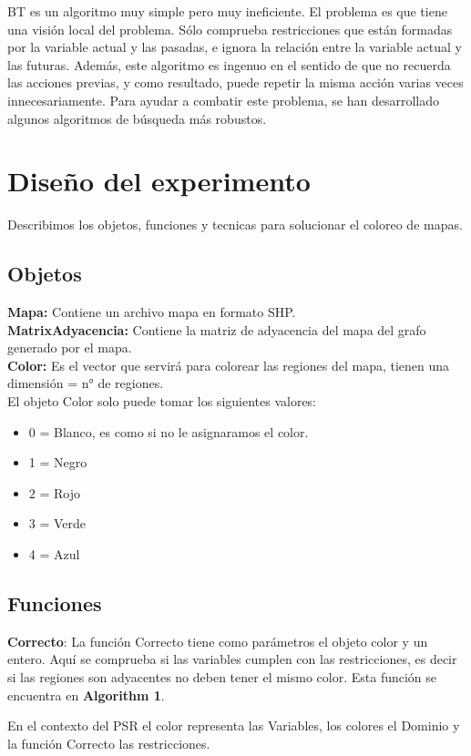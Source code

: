 \documentclass[a4paper]{article}
\begin{document}
BT es un algoritmo muy simple pero muy ineficiente. El problema es que tiene una visión local del problema. Sólo comprueba restricciones que están formadas por la variable actual y las pasadas, e ignora la relación entre la variable actual y las futuras. Además, este algoritmo es ingenuo en el sentido de que no recuerda las acciones previas, y como resultado, puede repetir la misma acción varias veces innecesariamente. Para ayudar a combatir este problema, se han desarrollado algunos algoritmos de búsqueda más robustos.

 
\pagebreak

\section{Diseño del experimento}
Describimos los objetos, funciones y tecnicas para solucionar el coloreo de mapas.
\subsection{Objetos}
\textbf{Mapa:} Contiene un archivo mapa en formato SHP.\\ 
\textbf{MatrixAdyacencia:} Contiene la matriz de adyacencia del mapa del grafo generado por el mapa.\\
\textbf{Color:} Es el vector que servirá para colorear las regiones del mapa, tienen una dimensión = n° de regiones.\\ 
El objeto Color solo puede tomar los siguientes valores:

\begin{itemize}
	
\item 0 = Blanco, es como si no le asignaramos el color.
\item 1 = Negro
\item 2 = Rojo 
\item 3 = Verde 
\item 4 = Azul
\end{itemize}

\subsection{Funciones}
\textbf{Correcto}: La función Correcto tiene como parámetros el objeto color y un entero. Aquí se comprueba si las variables cumplen con las restricciones, es decir si las regiones son adyacentes no deben tener el mismo color. Esta función se encuentra en \textbf{Algorithm 1}.

En el contexto del PSR el color representa las Variables, los colores el Dominio y la función Correcto las restricciones.
\end{document}
